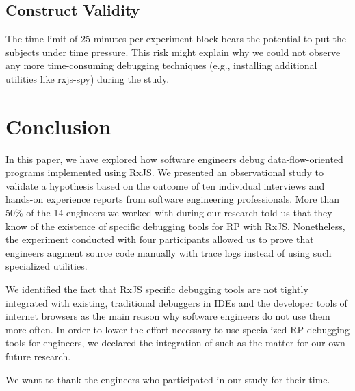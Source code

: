\documentclass[sigplan,screen]{acmart}
\begin{document}
\subsection{Construct Validity}

The time limit of 25 minutes per experiment block bears the potential to put the subjects under time pressure. This risk might explain why we could not observe any more time-consuming debugging techniques (e.g., installing additional utilities like rxjs-spy) during the study.


\section{Conclusion}
\label{sec:conclusion}

In this paper, we have explored how software engineers debug data-flow-oriented programs implemented using RxJS. We presented an observational study to validate a hypothesis based on the outcome of ten individual interviews and hands-on experience reports from software engineering professionals. More than 50\% of the 14 engineers we worked with during our research told us that they know of the existence of specific debugging tools for RP with RxJS. Nonetheless, the experiment conducted with four participants allowed us to prove that engineers augment source code manually with trace logs instead of using such specialized utilities.

We identified the fact that RxJS specific debugging tools are not tightly integrated with existing, traditional debuggers in IDEs and the developer tools of internet browsers as the main reason why software engineers do not use them more often. In order to lower the effort necessary to use specialized RP debugging tools for engineers, we declared the integration of such as the matter for our own future research.

\begin{acks}
	We want to thank the engineers who participated in our study for their time.
\end{acks}



\end{document}
